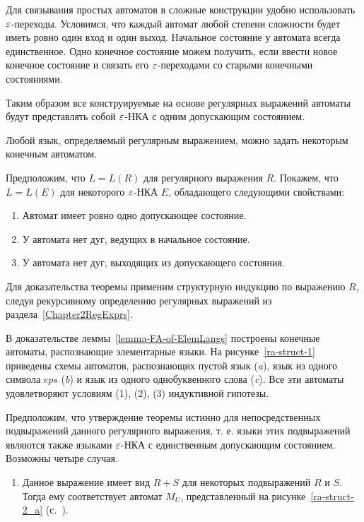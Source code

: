 Для связывания простых автоматов в сложные конструкции удобно 
использовать $\varepsilon$-переходы. Условимся, что каждый автомат любой 
степени сложности будет иметь ровно один вход и один выход. Начальное 
состояние у автомата всегда единственное. Одно конечное состояние можем 
получить, если ввести новое конечное состояние и связать его 
$\varepsilon$-переходами со старыми конечными состояниями.

Таким образом все конструируемые на основе регулярных выражений 
автоматы будут представлять собой $\varepsilon$-НКА с одним допускающим 
состоянием.

\begin{mytheorem}
Любой язык, определяемый регулярным выражением, можно задать некоторым 
конечным автоматом. 
\end{mytheorem}

\begin{myproof}

Предположим, что $L = L(R)$ для регулярного выражения $R$. Покажем, что  
$L = L(E)$ для некоторого $\varepsilon$-НКА $E$, обладающего следующими свойствами:
\begin{enumerate}
	\item Автомат имеет ровно одно допускающее состояние.
	\item У автомата нет дуг, ведущих в начальное состояние.
	\item У автомата нет дуг, выходящих из допускающего состояния.
\end{enumerate}
Для доказательства теоремы применим структурную индукцию по выражению $R$, 
следуя рекурсивному определению регулярных выражений из раздела~\ref{Chapter2RegExprs}.

В доказательстве леммы~\ref{lemma-FA-of-ElemLangs} построены конечные 
автоматы, распознающие элементарные языки. На рисунке~\ref{ra-struct-1} 
приведены схемы автоматов, распознающих пустой язык (\textsl{a}), язык 
из одного символа $eps$ (\textsl{b}) и язык из одного однобуквенного 
слова (\textsl{c}). Все эти автоматы удовлетворяют условиям (1), (2), 
(3) индуктивной гипотезы.




Предположим, что утверждение теоремы истинно для непосредственных подвыражений данного регулярного выражения, т. е. языки этих подвыражений являются также языками $\varepsilon$-НКА с единственным допускающим состоянием. Возможны четыре случая.
\begin{enumerate}
\item Данное выражение имеет вид $R + S$ для некоторых подвыражений $R$ и $S$. Тогда ему соответствует автомат $M_U$, представленный на рисунке~\ref{ra-struct-2_a} (с.~\pageref{ra-struct-2_a}).
	

\end{enumerate}
\end{myproof}
